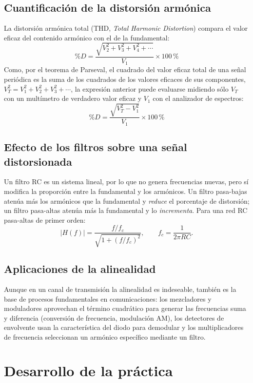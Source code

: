 \documentclass[12pt]{article}
\begin{document}
\subsection*{Cuantificación de la distorsión armónica}

La distorsión armónica total (THD, \emph{Total Harmonic Distortion}) compara el valor eficaz del contenido armónico con el de la fundamental:
\[
\%D = \frac{\sqrt{V_2^2 + V_3^2 + V_4^2 + \cdots}}{V_1}\times 100\,\%
\]
Como, por el teorema de Parseval, el cuadrado del valor eficaz total de una señal periódica es la suma de los cuadrados de los valores eficaces de sus componentes, $V_T^2 = V_1^2 + V_2^2 + V_3^2 + \cdots$, la expresión anterior puede evaluarse midiendo sólo $V_T$ con un multímetro de verdadero valor eficaz y $V_1$ con el analizador de espectros:
\[
\%D = \frac{\sqrt{V_T^2 - V_1^2}}{V_1}\times 100\,\%
\]

\subsection*{Efecto de los filtros sobre una señal distorsionada}

Un filtro RC es un sistema lineal, por lo que no genera frecuencias nuevas, pero sí modifica la proporción entre la fundamental y los armónicos. Un filtro pasa-bajas atenúa más los armónicos que la fundamental y \emph{reduce} el porcentaje de distorsión; un filtro pasa-altas atenúa más la fundamental y lo \emph{incrementa}. Para una red RC pasa-altas de primer orden:
\[
|H(f)| = \frac{f/f_c}{\sqrt{1 + (f/f_c)^2}}, \qquad f_c = \frac{1}{2\pi RC}.
\]

\subsection*{Aplicaciones de la alinealidad}

Aunque en un canal de transmisión la alinealidad es indeseable, también es la base de procesos fundamentales en comunicaciones: los mezcladores y moduladores aprovechan el término cuadrático para generar las frecuencias suma y diferencia (conversión de frecuencia, modulación AM), los detectores de envolvente usan la característica del diodo para demodular y los multiplicadores de frecuencia seleccionan un armónico específico mediante un filtro.

\section{Desarrollo de la práctica}
\end{document}
